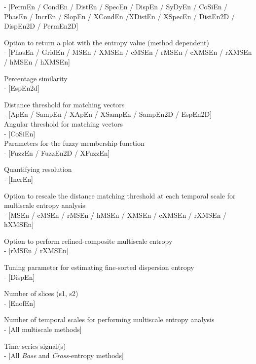 \documentclass[12pt, a4paper, titlepage, openany]{book}
\begin{document}
\begin{description}[labelsep=1cm, labelwidth=2cm, nosep, style=multiline,leftmargin=3cm]
 - [PermEn / CondEn / DistEn / SpecEn / DispEn / SyDyEn / CoSiEn / PhasEn / IncrEn / SlopEn / XCondEn /XDistEn / XSpecEn / DistEn2D / DispEn2D / PermEn2D]\\
\item[\texttt{Plotx}]		Option to return a plot with the entropy value (method dependent) \\
 - [PhasEn / GridEn / MSEn / XMSEn / cMSEn / rMSEn / cXMSEn / rXMSEn / hMSEn / hXMSEn]\\
\item[\texttt{ps}]		Percentage similarity \\  - [EspEn2d]\\
\item[\texttt{r}]		Distance threshold for matching vectors \\  - [ApEn / SampEn / XApEn / XSampEn / SampEn2D / EspEn2D]\\
 Angular threshold for matching vectors \\  - [CoSiEn]\\
 Parameters for the fuzzy membership function \\ - [FuzzEn / FuzzEn2D / XFuzzEn] \\
\item[\texttt{R}]		Quantifying resolution \\  - [IncrEn]\\
\item[\texttt{RadNew}]		Option to rescale the distance matching threshold at each temporal scale for multiscale entropy analysis \\  - [MSEn / cMSEn / rMSEn / hMSEn / XMSEn / cXMSEn / rXMSEn / hXMSEn]\\
\item[\texttt{Refined}]		Option to perform refined-composite multiscale entropy \\  - [rMSEn / rXMSEn]\\
\item[\texttt{rho}]		Tuning parameter for estimating fine-sorted dispersion entropy \\  - [DispEn]\\
\item[\texttt{S}]		Number of slices (s1, s2) \\  - [EnofEn]\\
\item[\texttt{Scales}]		Number of temporal scales for performing multiscale entropy analysis \\  - [All multiscale methods]\\
\item[\texttt{Sig}]		Time series signal(s) \\ - [All \textit{Base} and \textit{Cross-}entropy methods]\\

\end{description}
\end{document}
